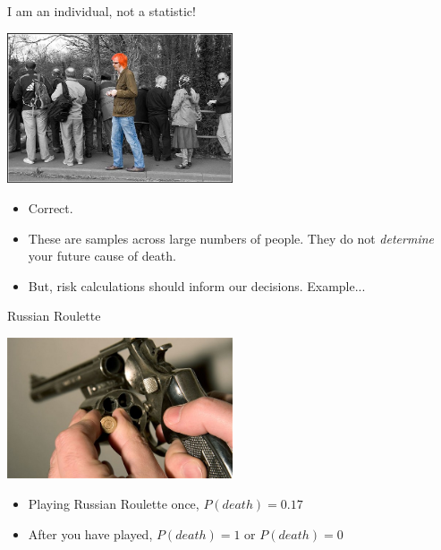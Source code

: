 \documentclass{beamer}
\begin{document}
\begin{frame}{I am an individual, not a statistic!}
\centerline{\includegraphics[width=0.5\textwidth]{pics/individual.jpg}}
\begin{itemize}
\item Correct. 
\item These are samples across large numbers of people. They do not \emph{determine} your future cause of death. 
\item But, risk calculations should inform our decisions. Example...
\end{itemize}
\end{frame}

\begin{frame}{Russian Roulette}
\centerline{\includegraphics[width=0.5\textwidth]{pics/russianroulette.jpg}}
\begin{itemize}
\item Playing Russian Roulette once, $P(death)= 0.17$
\item After you have played, $P(death) = 1$  or $P(death) = 0$ 
\end{itemize}
\end{frame}
\end{document}
